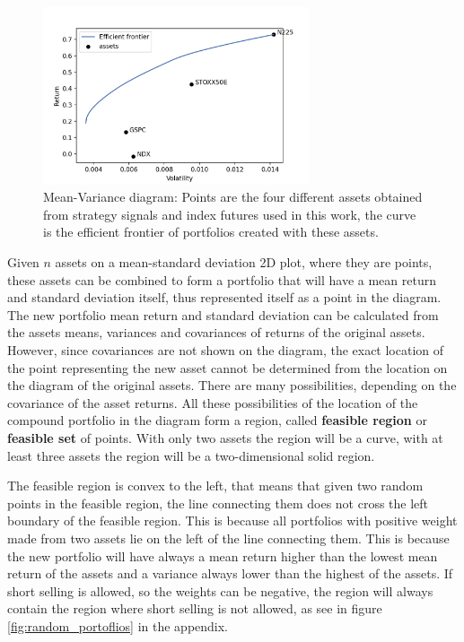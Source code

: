 \begin{figure}[h]
    \centering
    \includegraphics[width=0.7\textwidth]{Appendix/ef_assets.png}
    \caption[Mean-Variance diagram example]{Mean-Variance diagram: Points are the four different assets obtained from strategy signals and index futures used in this work, the curve is the efficient frontier of portfolios created with these assets.}
    \label{fig:efficient_frontier_assets}
\end{figure}

\hfill \break

Given $n$ assets on a mean-standard deviation 2D plot, where they are points, these assets can be combined to form a portfolio that will have a mean return and standard deviation itself, thus represented itself as a point in the diagram. 
The new portfolio mean return and standard deviation can be calculated from the assets means, variances and covariances of returns of the original assets. However, since covariances are not shown on the diagram, the exact location of the point representing the new asset cannot be determined from the location on the diagram of the original assets. There are many possibilities, depending on the covariance of the asset returns.
All these possibilities of the location of the compound portfolio in the diagram form a region, called \textbf{feasible region} or \textbf{feasible set} of points. 
With only two assets the region will be a curve, with at least three assets the region will be a two-dimensional solid region.

\hfill \break

The feasible region is convex to the left, that means that given two random points in the feasible region, the line connecting them does not cross the left boundary of the feasible region. This is because all portfolios with positive weight made from two assets lie on the left of the line connecting them. This is because the new portfolio will have always a mean return higher than the lowest mean return of the assets and a variance always lower than the highest of the assets.
If short selling is allowed, so the weights can be negative, the region will always contain the region where short selling is not allowed, as see in figure \ref{fig:random_portoflios} in the appendix.

